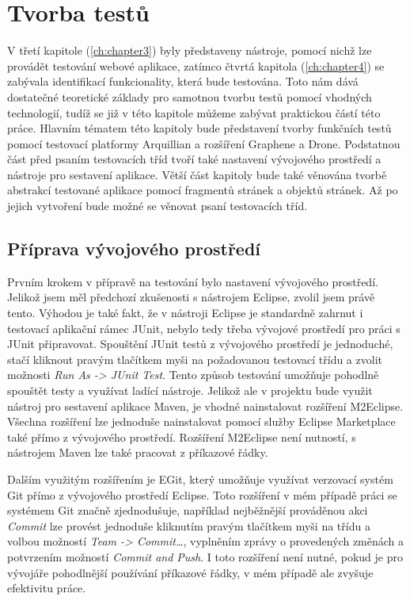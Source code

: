 \documentclass[
    color,   %
	table,   %
    twoside, %
    nolot, nolof
]{fithesis3}
\begin{document}
\chapter{Tvorba testů}
\label{ch:chapter5}
V třetí kapitole (\ref{ch:chapter3}) byly představeny nástroje, pomocí nichž lze provádět testování webové aplikace, zatímco čtvrtá kapitola (\ref{ch:chapter4}) se zabývala identifikací funkcionality, která bude testována. Toto nám dává dostatečné teoretické základy pro samotnou tvorbu testů pomocí vhodných technologií, tudíž se již v této kapitole můžeme zabývat praktickou částí této práce. Hlavním tématem této kapitoly bude představení tvorby funkčních testů pomocí testovací platformy Arquillian a rozšíření Graphene a Drone. Podstatnou část před psaním testovacích tříd tvoří také nastavení vývojového prostředí a nástroje pro sestavení aplikace. Větší část kapitoly bude také věnována tvorbě abstrakcí testované aplikace pomocí fragmentů stránek a objektů stránek. Až po jejich vytvoření bude možné se věnovat psaní testovacích tříd.

\section{Příprava vývojového prostředí}
Prvním krokem v přípravě na testování bylo nastavení vývojového prostředí. Jelikož jsem měl předchozí zkušenosti s nástrojem Eclipse, zvolil jsem právě tento. Výhodou je také fakt, že v nástroji Eclipse je standardně zahrnut i testovací aplikační rámec JUnit, nebylo tedy třeba vývojové prostředí  pro práci s JUnit připravovat. Spouštění JUnit testů z vývojového prostředí je jednoduché, stačí kliknout pravým tlačítkem myši na požadovanou testovací třídu a zvolit možnosti \emph{Run As -> JUnit Test}. Tento způsob testování umožňuje pohodlně spouštět testy a využívat ladící nástroje. Jelikož ale v projektu bude využit nástroj pro sestavení aplikace Maven, je vhodné nainstalovat rozšíření M2Eclipse. Všechna rozšíření lze jednoduše nainstalovat pomocí služby Eclipse Marketplace také přímo z vývojového prostředí. Rozšíření M2Eclipse není nutností, s nástrojem Maven lze také pracovat z příkazové řádky.

Dalším využitým rozšířením je EGit, který umožňuje využívat verzovací systém Git přímo z vývojového prostředí Eclipse. Toto rozšíření v mém případě práci se systémem Git značně zjednodušuje, například nejběžnější prováděnou akci \emph{Commit} lze provést jednoduše kliknutím pravým tlačítkem myši na třídu a volbou možností \emph{Team -> Commit\ldots}, vyplněním zprávy o provedených změnách a potvrzením možností \emph{Commit and Push}. I toto rozšíření není nutné, pokud je pro vývojáře pohodlnější používání příkazové řádky, v mém případě ale zvyšuje efektivitu práce.
\end{document}
